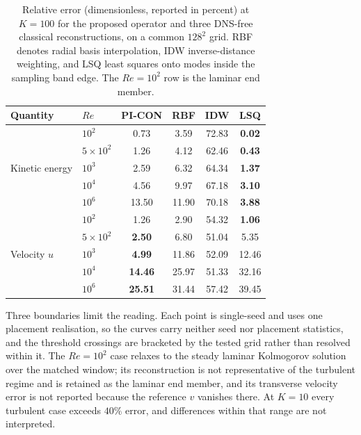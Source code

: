 \begin{table}[!htbp]
    \centering
    \caption{Relative error (dimensionless, reported in percent) at $K=100$ for the proposed operator and three DNS-free classical reconstructions, on a common $128^{2}$ grid. RBF denotes radial basis interpolation, IDW inverse-distance weighting, and LSQ least squares onto modes inside the sampling band edge. The $Re=10^{2}$ row is the laminar end member.}
    \label{tab:crossre_baselines}
    \small
    \begin{tabular}{llcccc}
    \toprule
    \textbf{Quantity} & \textbf{$Re$} & \textbf{PI-CON} & RBF & IDW & LSQ \\
    \midrule
    \multirow{5}{*}{Kinetic energy}
      & $10^{2}$        & 0.73  & 3.59  & 72.83 & \textbf{0.02} \\
      & $5\times10^{2}$ & 1.26  & 4.12  & 62.46 & \textbf{0.43} \\
      & $10^{3}$        & 2.59  & 6.32  & 64.34 & \textbf{1.37} \\
      & $10^{4}$        & 4.56  & 9.97  & 67.18 & \textbf{3.10} \\
      & $10^{6}$        & 13.50 & 11.90 & 70.18 & \textbf{3.88} \\
    \midrule
    \multirow{5}{*}{Velocity $u$}
      & $10^{2}$        & 1.26  & 2.90  & 54.32 & \textbf{1.06} \\
      & $5\times10^{2}$ & \textbf{2.50}  & 6.80  & 51.04 & 5.35 \\
      & $10^{3}$        & \textbf{4.99}  & 11.86 & 52.09 & 12.46 \\
      & $10^{4}$        & \textbf{14.46} & 25.97 & 51.33 & 32.16 \\
      & $10^{6}$        & \textbf{25.51} & 31.44 & 57.42 & 39.45 \\
    \bottomrule
    \end{tabular}
\end{table}

Three boundaries limit the reading. Each point is single-seed and uses one placement realisation, so the curves carry neither seed nor placement statistics, and the threshold crossings are bracketed by the tested grid rather than resolved within it. The $Re=10^{2}$ case relaxes to the steady laminar Kolmogorov solution over the matched window; its reconstruction is not representative of the turbulent regime and is retained as the laminar end member, and its transverse velocity error is not reported because the reference $v$ vanishes there. At $K=10$ every turbulent case exceeds $40\%$ error, and differences within that range are not interpreted.

